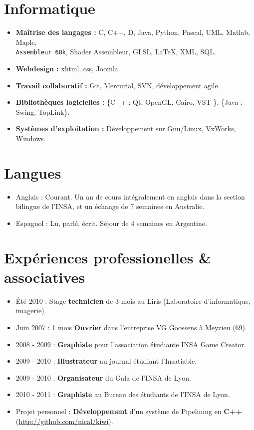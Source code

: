 \section*{Informatique }
	\begin{itemize}
		\item \textbf{Maîtrise des langages :} C, C++, D, Java, Python, Pascal, UML, Matlab, Maple, ~\\ \texttt{Assembleur 68k}, Shader Assembleur, GLSL, \LaTeX, XML, SQL.
		\item \textbf{Webdesign :} xhtml, css, Joomla.
		\item \textbf{Travail collaboratif :} Git, Mercurial, SVN, développement agile.
		\item  \textbf{Bibliothèques logicielles :} {\color{gray}\{C++ : } Qt, OpenGL, Cairo, VST{\color{gray} \}}, {\color{gray}\{Java : }Swing, TopLink{\color{gray}\}}.
		\item  \textbf{Systèmes d'exploitation :} Développement sur Gnu/Linux, VxWorks, Windows.
	\end{itemize} 

\section*{Langues }
	\begin{itemize}
		\item{Anglais :} Courant. Un an de cours intégralement en anglais dans la section bilingue de l'INSA, et un échange de 7 semaines en Australie.
		\item{Espagnol :} Lu, parlé, écrit. Séjour de 4 semaines en Argentine.
	\end{itemize}

\section*{Expériences professionelles \& associatives } 
	\begin{itemize}
		\item Été 2010 : Stage \textbf{technicien} de 3 mois au Liris (Laboratoire d'informatique, imagerie). 
		\item Juin 2007 : 1 mois \textbf{Ouvrier} dans l'entreprise VG Goossens à Meyzieu (69).
		\item 2008 - 2009 : \textbf{Graphiste} pour l'association étudiante INSA Game Creator.
		\item 2009 - 2010 : \textbf{Illustrateur} au journal étudiant l'Insatiable.
		\item 2009 - 2010 : \textbf{Organisateur} du Gala de l'INSA de Lyon.
		\item 2010 - 2011 : \textbf{Graphiste} au Bureau des étudiants de l'INSA de Lyon.
		\item Projet personnel : \textbf{Développement} d'un système de Pipelining en \textbf{C++} ~\\ (\url{http://github.com/nical/kiwi}).
	\end{itemize}

